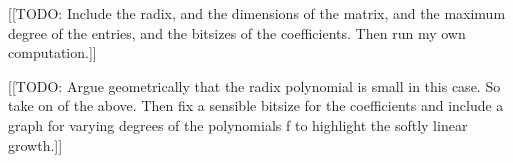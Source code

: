 [[TODO:  Include the radix, and the dimensions of the matrix, 
and the maximum degree of the entries, and the bitsizes of the 
coefficients.  Then run my own computation.]]

[[TODO:  Argue geometrically that the radix polynomial is small in 
this case.  So take on of the above.  Then fix a sensible bitsize 
for the coefficients and include a graph for varying degrees of 
the polynomials f to highlight the softly linear growth.]]

